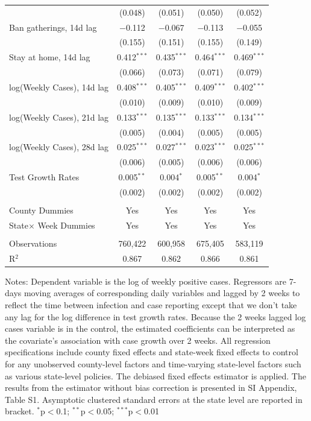 \documentclass[9pt,twoside,lineno]{pnas-new}
\theoremstyle{definition}
\begin{document}
\begin{table}[!htbp]
{\begin{tabular}{@{\extracolsep{1pt}}lcc|cc}
  & (0.048) & (0.051) & (0.050) & (0.052) \\ 
 Ban gatherings, 14d  lag & $-$0.112 & $-$0.067 & $-$0.113 & $-$0.055 \\ 
  & (0.155) & (0.151) & (0.155) & (0.149) \\ 
Stay at home, 14d  lag & 0.412$^{***}$ & 0.435$^{***}$ & 0.464$^{***}$ & 0.469$^{***}$ \\ 
  & (0.066) & (0.073) & (0.071) & (0.079) \\ \hline 
log(Weekly Cases), 14d  lag  & 0.408$^{***}$ & 0.405$^{***}$ & 0.409$^{***}$ & 0.402$^{***}$ \\ 
  & (0.010) & (0.009) & (0.010) & (0.009) \\ 
 log(Weekly Cases), 21d  lag & 0.133$^{***}$ & 0.135$^{***}$ & 0.133$^{***}$ & 0.134$^{***}$ \\ 
  & (0.005) & (0.004) & (0.005) & (0.005) \\ 
   log(Weekly Cases), 28d  lag  & 0.025$^{***}$ & 0.027$^{***}$ & 0.023$^{***}$ & 0.025$^{***}$ \\ 
  & (0.006) & (0.005) & (0.006) & (0.006) \\ 
  Test Growth Rates & 0.005$^{**}$ & 0.004$^{*}$ & 0.005$^{**}$ & 0.004$^{*}$ \\ 
  & (0.002) & (0.002) & (0.002) & (0.002) \\ 
 \hline \\[-1.8ex] 
County Dummies & Yes & Yes &  Yes  &  Yes  \\
State$\times$ Week Dummies&Yes & Yes &  Yes  &  Yes  \\
\hline \\[-1.8ex] 
Observations & 760,422 & 600,958 & 675,405 & 583,119 \\ 
R$^{2}$ & 0.867 & 0.862 & 0.866 & 0.861 \\   \hline
\hline %
\end{tabular}}
\vspace{-0.2cm}  {\scriptsize
\begin{flushleft}
Notes: Dependent variable is the log of weekly positive cases. Regressors are 7-days moving averages of corresponding daily variables  and lagged by 2 weeks to reflect the time between infection and case reporting except that we don't take any lag for the log difference in test growth rates.   Because the 2 weeks lagged log cases variable is in the control, the estimated coefficients can be interpreted as the covariate's association with case growth over 2 weeks.   All regression specifications include county fixed effects and state-week fixed effects to control for any unobserved county-level factors and time-varying state-level factors such as  various state-level policies.
The debiased fixed effects estimator is applied.  The results from the estimator without bias correction is presented in  SI Appendix, Table S1.
Asymptotic clustered standard errors at the state level are reported in bracket.   {$^{*}$p$<$0.1; $^{**}$p$<$0.05; $^{***}$p$<$0.01}
\end{flushleft}}
\end{table}
  
\end{document}
